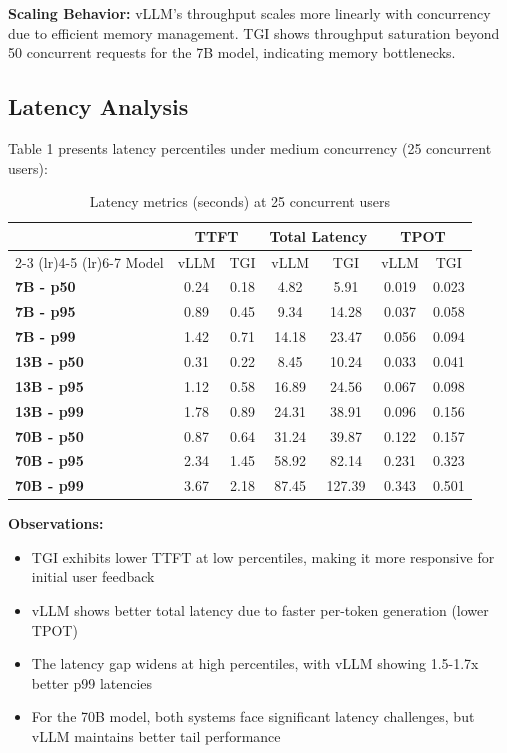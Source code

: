 \documentclass{article}
\begin{document}
\textbf{Scaling Behavior:} vLLM's throughput scales more linearly with concurrency due to efficient memory management. TGI shows throughput saturation beyond 50 concurrent requests for the 7B model, indicating memory bottlenecks.

\subsection{Latency Analysis}

Table 1 presents latency percentiles under medium concurrency (25 concurrent users):

\begin{table}[h]
\centering
\caption{Latency metrics (seconds) at 25 concurrent users}
\begin{tabular}{lcccccc}
\toprule
& \multicolumn{2}{c}{TTFT} & \multicolumn{2}{c}{Total Latency} & \multicolumn{2}{c}{TPOT} \\
\cmidrule(lr){2-3} \cmidrule(lr){4-5} \cmidrule(lr){6-7}
Model & vLLM & TGI & vLLM & TGI & vLLM & TGI \\
\midrule
\textbf{7B - p50} & 0.24 & 0.18 & 4.82 & 5.91 & 0.019 & 0.023 \\
\textbf{7B - p95} & 0.89 & 0.45 & 9.34 & 14.28 & 0.037 & 0.058 \\
\textbf{7B - p99} & 1.42 & 0.71 & 14.18 & 23.47 & 0.056 & 0.094 \\
\midrule
\textbf{13B - p50} & 0.31 & 0.22 & 8.45 & 10.24 & 0.033 & 0.041 \\
\textbf{13B - p95} & 1.12 & 0.58 & 16.89 & 24.56 & 0.067 & 0.098 \\
\textbf{13B - p99} & 1.78 & 0.89 & 24.31 & 38.91 & 0.096 & 0.156 \\
\midrule
\textbf{70B - p50} & 0.87 & 0.64 & 31.24 & 39.87 & 0.122 & 0.157 \\
\textbf{70B - p95} & 2.34 & 1.45 & 58.92 & 82.14 & 0.231 & 0.323 \\
\textbf{70B - p99} & 3.67 & 2.18 & 87.45 & 127.39 & 0.343 & 0.501 \\
\bottomrule
\end{tabular}
\end{table}

\textbf{Observations:}

\begin{itemize}
    \item TGI exhibits lower TTFT at low percentiles, making it more responsive for initial user feedback
    \item vLLM shows better total latency due to faster per-token generation (lower TPOT)
    \item The latency gap widens at high percentiles, with vLLM showing 1.5-1.7x better p99 latencies
    \item For the 70B model, both systems face significant latency challenges, but vLLM maintains better tail performance
\end{itemize}
\end{document}
